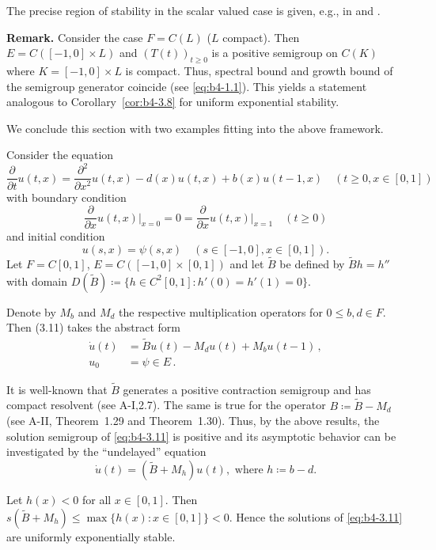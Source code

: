 The precise region of stability in the scalar valued case is given, e.g., in \citet{hadeler:1978}  and  \citet[p.107ff]{hale:1977}.

\medskip\noindent
\textbf{Remark.}
	Consider the case $F = C(L)$ ($L$ compact).
	Then $E = C([-1,0] \times L)$ and $(T(t))_{t\geq0}$ is a positive semigroup on $C(K)$ where $K = [-1,0] \times L$ is compact. 
	Thus, spectral bound and growth bound of the semigroup generator coincide (see \eqref{eq:b4-1.1}). 
	This yields a statement analogous to Corollary~\ref{cor:b4-3.8} for uniform exponential stability.

\medskip 
We conclude this section with two examples fitting into the above framework.

\begin{example}\label{ex:b4-3.11}
	Consider the equation
	\[
	\frac{\partial}{\partial t}u(t,x) = \frac{\partial^2}{\partial x^2}u(t,x) - d(x)u(t,x) + b(x)u(t-1,x) \quad (t\geq0,x\in[0,1])
	\]
	with boundary condition
	\begin{equation}\label{eq:b4-3.11}
	\frac{\partial}{\partial x}u(t,x)\big|_{x=0} = 0 = \frac{\partial}{\partial x}u(t,x)\big|_{x=1} \quad (t\geq0)
	\end{equation}
	and initial condition
	\[
	u(s,x) = \psi(s,x) \quad (s\in[-1,0],x\in[0,1]) .
	\]
%
%
%
Let $F = C[0,1]$, $E = C([-1,0]\times[0,1])$ and let $\tilde{B}$ be defined by $\tilde{B}h = h''$ with domain $D(\tilde{B}) \coloneq  \{h \in C^2[0,1] \colon h'(0) = h'(1) = 0\}$.

Denote by $M_b$ and $M_d$ the respective multiplication operators for $0 \leq b,d \in F$. 
Then (3.11) takes the abstract form
\begin{align*}
	\dot{u}(t) &= \tilde{B}u(t) - M_du(t) + M_bu(t-1)\,,\\
	u_0 &= \psi \in E\,.
\end{align*}

It is well-known that $\tilde{B}$ generates a positive contraction semigroup and has compact resolvent (see A-I,2.7). 
The same is true for the operator $B  \coloneq  \tilde{B} - M_d$ (see A-II, Theorem~1.29 and Theorem~1.30). 
Thus, by the above results, the solution semigroup of \eqref{eq:b4-3.11} is positive and its asymptotic behavior can be investigated by the \enquote{undelayed} equation
\[
\dot{u}(t) = (\tilde{B} + M_h)u(t) , \text{ where } h \coloneq  b - d .
\]

Let $h(x) < 0$ for all $x \in [0,1]$.
Then $s(\tilde{B} + M_h) \leq \max\{h(x) \colon x \in [0,1]\} < 0$. 
Hence the solutions of \eqref{eq:b4-3.11} are uniformly exponentially stable.
\end{example}

